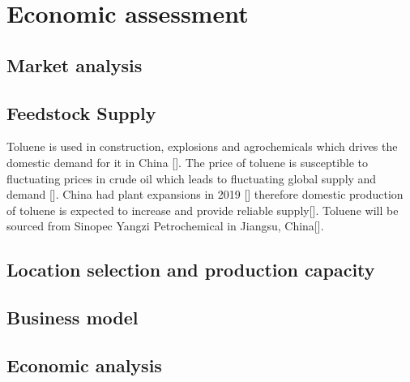 \section{Economic assessment}
\label{sec:economics}
\subsection{Market analysis}



\subsection{Feedstock Supply}
Toluene is used in construction, explosions and agrochemicals which drives the domestic demand for it in China []. The price of toluene is susceptible to fluctuating prices in crude oil which leads to fluctuating global supply and demand []. China had plant expansions in 2019 [] therefore domestic production of toluene is expected to increase and provide reliable supply[]. Toluene will be sourced from Sinopec Yangzi Petrochemical in Jiangsu, China[].

\subsection{Location selection and production capacity} 


\subsection{Business model} 


\subsection{Economic analysis} 
